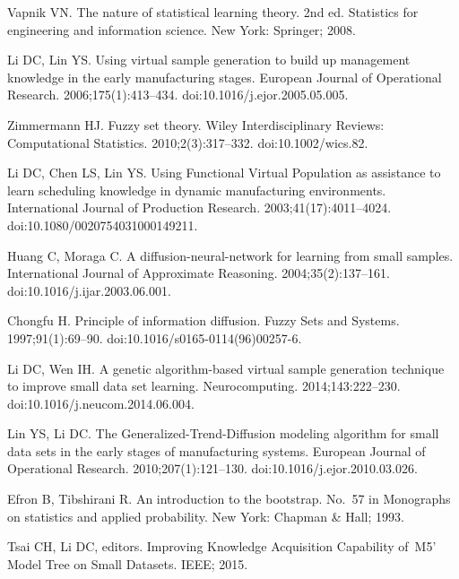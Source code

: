 \documentclass[10pt,letterpaper]{article}
\begin{document}
\begin{thebibliography}{10}
  Vapnik VN.
  \newblock The nature of statistical learning theory.
  \newblock 2nd ed. Statistics for engineering and information science. New York:
    Springer; 2008.
  
  Li DC, Lin YS.
  \newblock Using virtual sample generation to build up management knowledge in
    the early manufacturing stages.
  \newblock European Journal of Operational Research. 2006;175(1):413--434.
  \newblock doi:{10.1016/j.ejor.2005.05.005}.
  
  Zimmermann HJ.
  \newblock Fuzzy set theory.
  \newblock Wiley Interdisciplinary Reviews: Computational Statistics.
    2010;2(3):317--332.
  \newblock doi:{10.1002/wics.82}.
  
  Li DC, Chen LS, Lin YS.
  \newblock Using Functional Virtual Population as assistance to learn scheduling
    knowledge in dynamic manufacturing environments.
  \newblock International Journal of Production Research. 2003;41(17):4011--4024.
  \newblock doi:{10.1080/0020754031000149211}.
  
  Huang C, Moraga C.
  \newblock A diffusion-neural-network for learning from small samples.
  \newblock International Journal of Approximate Reasoning. 2004;35(2):137--161.
  \newblock doi:{10.1016/j.ijar.2003.06.001}.
  
  Chongfu H.
  \newblock Principle of information diffusion.
  \newblock Fuzzy Sets and Systems. 1997;91(1):69--90.
  \newblock doi:{10.1016/s0165-0114(96)00257-6}.
  
  Li DC, Wen IH.
  \newblock A genetic algorithm-based virtual sample generation technique to
    improve small data set learning.
  \newblock Neurocomputing. 2014;143:222--230.
  \newblock doi:{10.1016/j.neucom.2014.06.004}.
  
  Lin YS, Li DC.
  \newblock The Generalized-Trend-Diffusion modeling algorithm for small data
    sets in the early stages of manufacturing systems.
  \newblock European Journal of Operational Research. 2010;207(1):121--130.
  \newblock doi:{10.1016/j.ejor.2010.03.026}.
  
  Efron B, Tibshirani R.
  \newblock An introduction to the bootstrap.
  \newblock No.~57 in Monographs on statistics and applied probability. New York:
    Chapman \& Hall; 1993.
  
  Tsai CH, Li DC, editors.
  \newblock Improving Knowledge Acquisition Capability of~M5' Model Tree on Small
    Datasets. IEEE; 2015.
  

\end{thebibliography}
\end{document}
